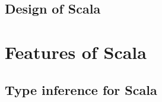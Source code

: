 \documentclass[notheorems, aspectratio=54]{beamer}
\begin{document}
\begin{frame}
      
\end{frame}

\subsection{Design of Scala}
\begin{frame}
  
\end{frame}

\begin{frame}


\end{frame}


\section{Features of Scala}
\subsection{Type inference for Scala}
\begin{frame}


\end{frame}


\end{document}
